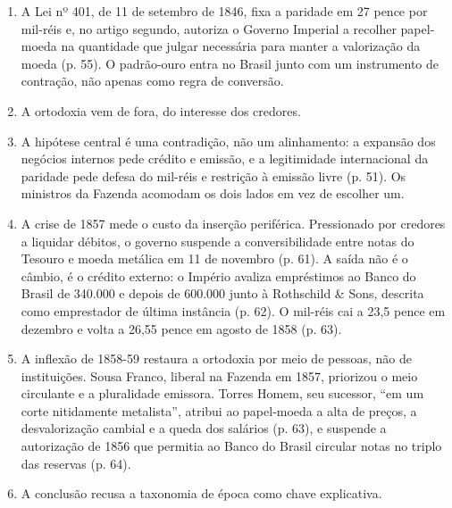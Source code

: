 \begin{enumerate}[leftmargin=*,nosep]
\item A Lei nº 401, de 11 de setembro de 1846, fixa a paridade em 27 pence por
mil-réis e, no artigo segundo, autoriza o Governo Imperial a recolher
papel-moeda na quantidade que julgar necessária para manter a valorização da
moeda (p. 55). O padrão-ouro entra no Brasil junto com um instrumento de
contração, não apenas como regra de conversão.

\item A ortodoxia vem de fora, do interesse dos credores.


\item A hipótese central é uma contradição, não um alinhamento: a expansão dos
negócios internos pede crédito e emissão, e a legitimidade internacional da
paridade pede defesa do mil-réis e restrição à emissão livre (p. 51). Os
ministros da Fazenda acomodam os dois lados em vez de escolher um.

\item A crise de 1857 mede o custo da inserção periférica. Pressionado por
credores a liquidar débitos, o governo suspende a conversibilidade entre notas
do Tesouro e moeda metálica em 11 de novembro (p. 61). A saída não é o câmbio,
é o crédito externo: o Império avaliza empréstimos ao Banco do Brasil de
\textsterling{}340.000 e depois de \textsterling{}600.000 junto à Rothschild
\& Sons, descrita como emprestador de última instância (p. 62). O mil-réis cai
a 23,5 pence em dezembro e volta a 26,55 pence em agosto de 1858 (p. 63).

\item A inflexão de 1858-59 restaura a ortodoxia por meio de pessoas, não de
instituições. Sousa Franco, liberal na Fazenda em 1857, priorizou o meio
circulante e a pluralidade emissora. Torres Homem, seu sucessor, ``em um corte
nitidamente metalista'', atribui ao papel-moeda a alta de preços, a
desvalorização cambial e a queda dos salários (p. 63), e suspende a autorização
de 1856 que permitia ao Banco do Brasil circular notas no triplo das reservas
(p. 64).

\item A conclusão recusa a taxonomia de época como chave explicativa.

\end{enumerate}

